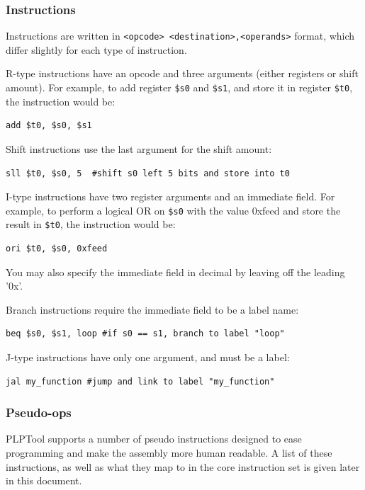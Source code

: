 \documentclass{article}
\begin{document}
\subsubsection{Instructions}
Instructions are written in 
\verb+<opcode> <destination>,<operands>+
format, which differ slightly for each type of instruction.

R-type instructions have an opcode and three arguments (either registers or shift amount). For example, to add register 
\verb+$s0+ and \verb+$s1+, 
and store it in register \verb+$t0+, the instruction would be:

\begin{verbatim}
add $t0, $s0, $s1
\end{verbatim}

Shift instructions use the last argument for the shift amount:

\begin{verbatim}
sll $t0, $s0, 5  #shift s0 left 5 bits and store into t0
\end{verbatim}

I-type instructions have two register arguments and an immediate field. For example, to perform a logical OR on 
\verb+$s0+ with the value 0xfeed and store the result in 
\verb+$t0+, the instruction would be:

\begin{verbatim}
ori $t0, $s0, 0xfeed
\end{verbatim}

You may also specify the immediate field in decimal by leaving off the leading '0x'.

Branch instructions require the immediate field to be a label name:

\begin{verbatim}
beq $s0, $s1, loop #if s0 == s1, branch to label "loop"
\end{verbatim}

J-type instructions have only one argument, and must be a label:

\begin{verbatim}
jal my_function #jump and link to label "my_function"
\end{verbatim}

\subsubsection{Pseudo-ops}
PLPTool supports a number of pseudo instructions designed to ease programming and make the assembly more human readable. A list of these instructions, as well as what they map to in the core instruction set is given later in this document. 
\end{document}
